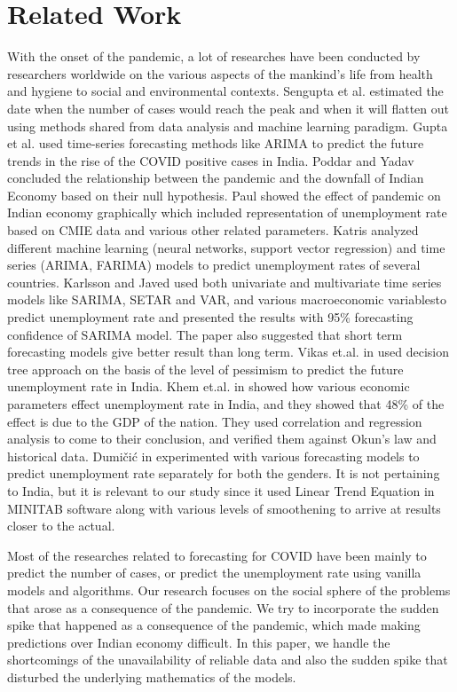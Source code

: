 \documentclass[times,twocolumn,final,authoryear]{elsarticle}
\begin{document}
	\section{Related Work}\label{Sec_Works}
	With the onset of the pandemic, a lot of researches have been conducted by researchers worldwide on the various aspects of the mankind's life from health and hygiene to social and environmental contexts. Sengupta et al. \cite{Sengupta} estimated the date when the number of cases would reach the peak and when it will flatten out using methods shared from data analysis and machine learning paradigm. Gupta et al. \cite{Gupta} used time-series forecasting methods like ARIMA to predict the future trends in the rise of the COVID positive cases in India. Poddar and Yadav \cite{Poddar} concluded the relationship between the pandemic and the downfall of Indian Economy based on their null hypothesis. Paul \cite{Paul} showed the effect of pandemic on Indian economy graphically which included representation of unemployment rate based on CMIE data and various other related parameters. Katris \cite{Katris} analyzed different machine learning (neural networks, support vector regression) and time series (ARIMA, FARIMA) models to predict unemployment rates of several countries. Karlsson and Javed \cite{Javed} used both univariate and multivariate time series models like SARIMA, SETAR and VAR, and various macroeconomic variablesto predict unemployment rate and presented the results with 95\% forecasting confidence of SARIMA model. The paper also suggested that short term forecasting models give better result than long term. Vikas et.al. in \cite{Vikas} used decision tree approach on the basis of the level of pessimism to predict the future unemployment rate in India. Khem et.al. in \cite{Khem} showed how various economic parameters effect unemployment rate in India, and they showed that 48\% of the effect is due to the GDP of the nation. They used correlation and regression analysis to come to their conclusion, and verified them against Okun's law and historical data. Dumičić in \cite{Dumicic} experimented with various forecasting models to predict unemployment rate separately for both the genders. It is not pertaining to India, but it is relevant to our study since it used Linear Trend Equation in MINITAB software along with various levels of smoothening to arrive at results closer to the actual.
	
	Most of the researches related to forecasting for COVID have been mainly to predict the number of cases, or predict the unemployment rate using vanilla models and algorithms. Our research focuses on the social sphere of the problems that arose as a consequence of the pandemic. We try to incorporate the sudden spike that happened as a consequence of the pandemic, which made making predictions over Indian economy difficult. In this paper, we handle the shortcomings of the unavailability of reliable data and also the sudden spike that disturbed the underlying mathematics of the models.
	
\end{document}
